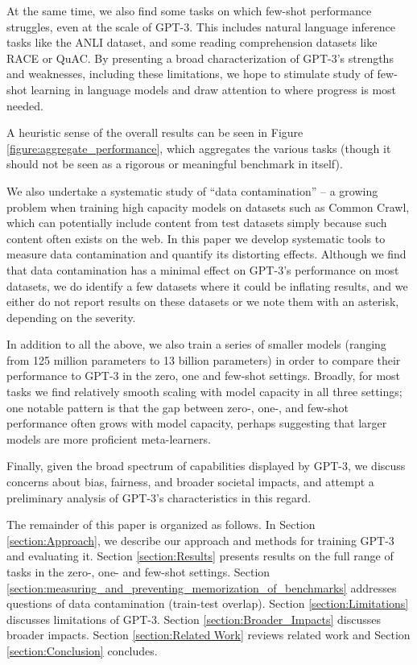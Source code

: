At the same time, we also find some tasks on which few-shot performance struggles, even at the scale of GPT-3.  This includes natural language inference tasks like the ANLI dataset, and some reading comprehension datasets like RACE or QuAC.  By presenting a broad characterization of GPT-3's strengths and weaknesses, including these limitations, we hope to stimulate study of few-shot learning in language models and draw attention to where progress is most needed.  

A heuristic sense of the overall results can be seen in Figure \ref{figure:aggregate_performance}, which aggregates the various tasks (though it should not be seen as a rigorous or meaningful benchmark in itself).

We also undertake a systematic study of ``data contamination'' -- a growing problem when training high capacity models on datasets such as Common Crawl, which can potentially include content from test datasets simply because such content often exists on the web. In this paper we develop systematic tools to measure data contamination and quantify its distorting effects.  Although we find that data contamination has a minimal effect on GPT-3's performance on most datasets, we do identify a few datasets where it could be inflating results, and we either do not report results on these datasets or we note them with an asterisk, depending on the severity.

In addition to all the above, we also train a series of smaller models (ranging from 125 million parameters to 13 billion parameters) in order to compare their performance to GPT-3 in the zero, one and few-shot settings.  Broadly, for most tasks we find relatively smooth scaling with model capacity in all three settings; one notable pattern is that the gap between zero-, one-, and few-shot performance often grows with model capacity, perhaps suggesting that larger models are more proficient meta-learners.

Finally, given the broad spectrum of capabilities displayed by GPT-3, we discuss concerns about bias, fairness, and broader societal impacts, and attempt a preliminary analysis of GPT-3's characteristics in this regard.

The remainder of this paper is organized as follows.  In Section \ref{section:Approach}, we describe our approach and methods for training GPT-3 and evaluating it.  Section \ref{section:Results} presents results on the full range of tasks in the zero-, one- and few-shot settings.  Section \ref{section:measuring_and_preventing_memorization_of_benchmarks} addresses questions of data contamination (train-test overlap).  Section \ref{section:Limitations} discusses limitations of GPT-3.  Section \ref{section:Broader_Impacts} discusses broader impacts.  Section \ref{section:Related Work} reviews related work and Section \ref{section:Conclusion} concludes.

